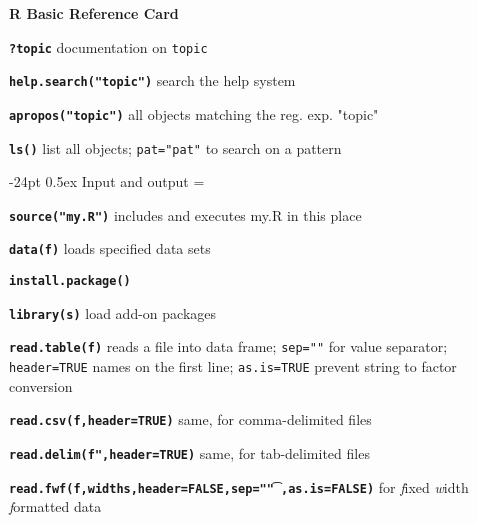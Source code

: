 \documentclass[8pt,landscape]{article}
\makeatletter
\renewcommand\section{\@startsection{section}{1}{0mm}%
                                     {-24pt}%
                                     {0.5ex}%
                                {\color{blue}\normalfont\large\bfseries}}
\newcommand{\code}{\texttt}
\newcommand{\bcode}[1]{\texttt{\textbf{#1}}}
\makeatother
\begin{document}
\footnotesize
\begin{multicols*}{3}

\setlength{\premulticols}{1pt}
\setlength{\postmulticols}{1pt}
\setlength{\multicolsep}{1pt}
\setlength{\columnsep}{2pt}

\begin{center}
     {\Large\textbf{\color{blue}R Basic Reference Card}}
\end{center}
%
%
\vspace{-2ex}
\bcode{?topic}  documentation on \code{topic} 

\bcode{help.search("topic")} search the help system 

\bcode{apropos("topic")} all objects matching the reg. exp. "topic"

\bcode{ls()} list all objects; \code{pat="pat"} to search on a pattern


\vspace{-7ex}
\section{Input and output}
\everypar={\hangindent=9mm}

\bcode{source("my.R")} includes and executes my.R in this place

\bcode{data(f)} loads specified data sets

\bcode{install.package()}

\bcode{library(s)} load add-on packages

\bcode{read.table(f)} reads a file into data frame; \code{sep=""} for value separator; \code{header=TRUE} names on the first line; \code{as.is=TRUE} 
                prevent string to factor conversion

\bcode{read.csv(f,header=TRUE)} same,  for comma-delimited files

\bcode{read.delim(f",header=TRUE)} same, for tab-delimited files

\bcode{read.fwf(f,widths,header=FALSE,sep="\t",as.is=FALSE)} for \emph{f}ixed \emph{w}idth \emph{f}ormatted data 



\end{multicols*}
\end{document}
